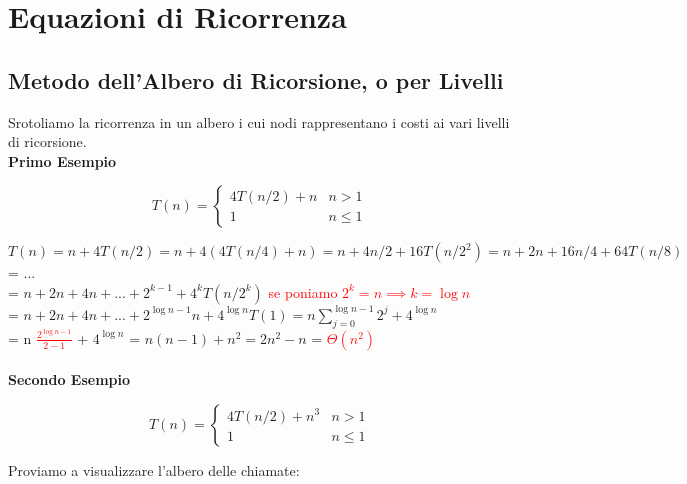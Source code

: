 \documentclass[../cheatSheetAlgoritmi.tex]{subfiles}
\begin{document}
\section{Equazioni di Ricorrenza}
\subsection{Metodo dell'Albero di Ricorsione, o per Livelli}
Srotoliamo la ricorrenza in un albero i cui nodi rappresentano i costi ai vari livelli di ricorsione.\\
\textbf{Primo Esempio}
\begin{center}
	\begin{equation*}
  		T(n)=\begin{cases}
    		4T(n/2) + n & \text{$n > 1$}\\
    		1 & \text{$n \leq 1$}
  		\end{cases}
	\end{equation*}
\end{center}
$T(n) = n + 4T(n/2) = n + 4(4T(n/4) + n) = n + 4n/2 + 16T(n/2^{2}) = n + 2n + 16n/4 + 64T(n/8)$\\
= ...\\
= $n + 2n + 4n + ... + 2^{k-1} + 4^{k}T(n/2^{k})$ \textcolor{red}{se poniamo $2^{k} = n \implies k = \log{n}$}\\
= $n + 2n + 4n + ... + 2^{\log{n-1}}n + 4^{\log{n}}T(1) = n \sum\limits_{j=0}^{\log{n-1}} {2^{j}} + 4^{\log{n}}$\\
= n \textcolor{red}{$\frac{2^{\log{n}-1}}{2-1}$} + $ 4^{\log{n}}$ = $n(n-1) + n^{2} = 2n^{2} - n$ = \textcolor{red}{$\Theta(n^{2})$}\\\\
\textbf{Secondo Esempio}
\begin{center}
	\begin{equation*}
  		T(n)=\begin{cases}
    		4T(n/2) + n^{3} & \text{$n > 1$}\\
    		1 & \text{$n \leq 1$}
  		\end{cases}
	\end{equation*}
\end{center}

Proviamo a visualizzare l'albero delle chiamate:
\end{document}
